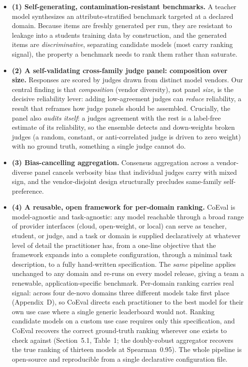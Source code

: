 \documentclass[11pt,a4paper]{article}
\begin{document}
\begin{itemize}
\tightlist
\item
  \textbf{(1) Self-generating, contamination-resistant benchmarks.} A teacher model synthesizes an
  attribute-stratified benchmark targeted at a declared domain. Because items are freshly generated per run, they
  are resistant to leakage into a student\textquotesingle s training data by construction, and the generated items are
  \emph{discriminative}, separating candidate models (most carry ranking signal), the property a benchmark needs to
  rank them rather than saturate.
\item
  \textbf{(2) A self-validating cross-family judge panel: composition over size.} Responses are scored by
  judges drawn from distinct model vendors. Our central finding is that \emph{composition} (vendor diversity), not
  panel \emph{size}, is the decisive reliability lever: adding low-agreement judges can \emph{reduce} reliability, a
  result that reframes how judge panels should be assembled. Crucially, the panel also \emph{audits itself}: a judge\textquotesingle s
  agreement with the rest is a label-free estimate of its reliability, so the ensemble detects and down-weights broken
  judges (a random, constant, or anti-correlated judge is driven to zero weight) with no ground truth, something a
  single judge cannot do.
\item
  \textbf{(3) Bias-cancelling aggregation.} Consensus aggregation across a vendor-diverse panel cancels
  verbosity bias that individual judges carry with mixed sign, and the vendor-disjoint design structurally precludes
  same-family self-preference.
\item
  \textbf{(4) A reusable, open framework for per-domain ranking.} CoEval is model-agnostic and
  task-agnostic: any model reachable through a broad range of provider interfaces (cloud, open-weight, or local) can
  serve as teacher, student, or judge, and a task or domain is supplied declaratively at whatever level of detail the
  practitioner has, from a one-line objective that the framework expands into a complete configuration, through a
  minimal task description, to a fully hand-written specification. The \emph{same} pipeline applies unchanged to any
  domain and re-runs on every model release, giving a team a renewable, application-specific
  benchmark. Per-domain ranking carries real signal: across four de-novo domains three different models take first
  place (Appendix~D), so CoEval directs each practitioner to the best model for their own use case where a
  single generic leaderboard would not. Ranking candidate models on a custom use case requires only this
  specification, and CoEval recovers the correct ground-truth ranking wherever one exists to check against
  (Section~5.1, Table~1; the doubly-robust aggregator recovers the true ranking of thirteen models at
  Spearman~0.95). The whole pipeline is open-source and reproducible from a single declarative
  configuration file.
\end{itemize}
\end{document}
